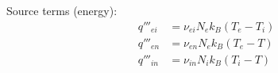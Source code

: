 Source terms (energy):
\begin{align}
    q'''_{ei} &= \nu_{ei} N_e k_B (T_e - T_i) \\
    q'''_{en} &= \nu_{en} N_e k_B (T_e - T) \\
    q'''_{in} &= \nu_{in} N_i k_B (T_i - T)
\end{align}